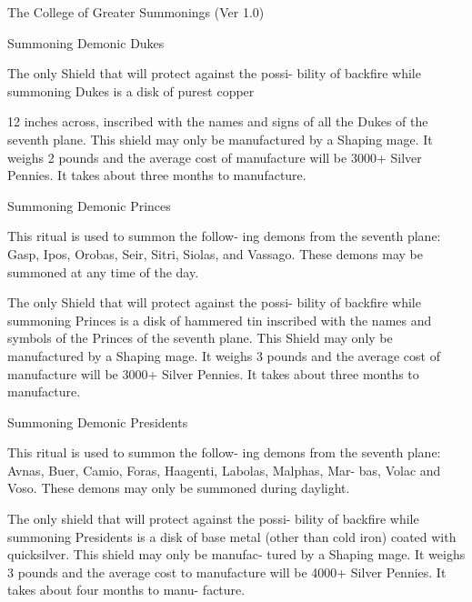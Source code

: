 \begin{Chapter}{The College of Greater Summonings (Ver 1.0)}
\begin{ritual}[R-1]{Summoning Demonic Dukes }
\begin{effects}
The only Shield that will protect against the possi-
bility of backfire while summoning Dukes is a disk 
of purest copper 

12  inches  across,  inscribed  with  the  names  and 
signs  of  all  the  Dukes  of  the  seventh  plane.  This 
shield  may  only  be  manufactured  by  a  Shaping 
mage.  It  weighs  2  pounds  and  the  average  cost  of 
manufacture will be 3000+ Silver Pennies. It takes 
about three months to manufacture. 

\end{effects}
\end{ritual}

\begin{ritual}[R-2]{Summoning Demonic Princes }

\begin{effects}
 This  ritual  is  used  to  summon  the  follow-
ing  demons  from  the  seventh  plane:  Gasp,  Ipos, 
Orobas,  Seir,  Sitri,  Siolas,  and  Vassago.  These 
demons may be summoned at any time of the day. 

The only Shield that will protect against the possi-
bility  of  backfire  while  summoning  Princes  is  a 
disk of hammered tin inscribed with the names and 
symbols  of  the  Princes  of  the  seventh  plane.  This 
Shield  may  only  be  manufactured  by  a  Shaping 
mage.  It  weighs  3  pounds  and  the  average  cost  of 
manufacture will be 3000+ Silver Pennies. It takes 
about three months to manufacture. 

\end{effects}
\end{ritual}

\begin{ritual}[R-3]{Summoning Demonic Presidents }

\begin{effects}
 This  ritual  is  used  to  summon  the  follow-
ing  demons  from  the  seventh  plane:  Avnas,  Buer, 
Camio,  Foras,  Haagenti,  Labolas,  Malphas,  Mar-
bas,  Volac  and  Voso.  These  demons  may  only  be 
summoned during daylight. 

The only shield that will protect against the possi-
bility of backfire while summoning Presidents is a 
disk  of  base  metal  (other  than  cold  iron)  coated 
with quicksilver. This shield may only be manufac-
tured  by  a  Shaping  mage.  It  weighs  3  pounds  and 
the  average  cost  to  manufacture  will  be  4000+ 
Silver Pennies. It takes about four months to manu-
facture. 


\end{effects}
\end{ritual}
\end{Chapter}
